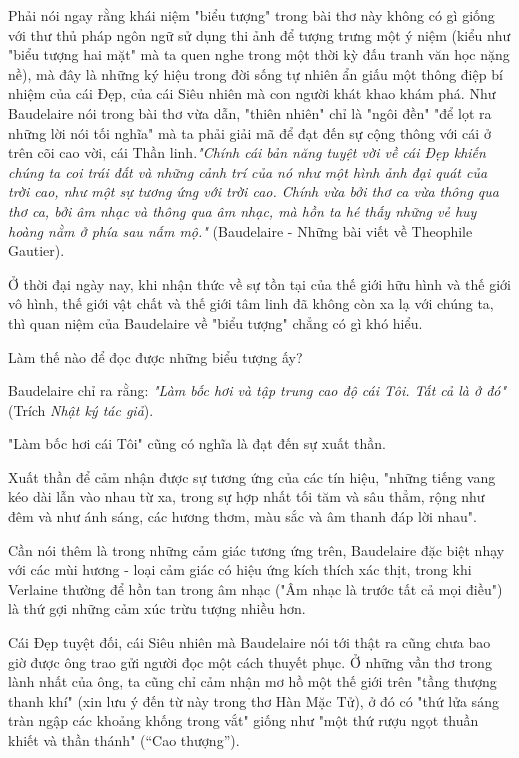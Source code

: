 \documentclass[../main.tex]{subfiles}
\begin{document}
\begin{multicols}{2}
\begin{blockquote}
\end{blockquote}
 
Phải nói ngay rằng khái niệm "biểu tượng" trong bài thơ này không có gì giống với thư thủ pháp ngôn ngữ sử dụng thi ảnh để tượng trưng một ý niệm (kiểu như "biểu tượng hai mặt" mà ta quen nghe trong một thời kỳ đấu tranh văn học nặng nề), mà đây là những ký hiệu trong đời sống tự nhiên ẩn giấu một thông điệp bí nhiệm của cái Đẹp, của cái Siêu nhiên mà con người khát khao khám phá. Như Baudelaire nói trong bài thơ vừa dẫn, "thiên nhiên" chỉ là "ngôi đền" "để lọt ra những lời nói tối nghĩa" mà ta phải giải mã để đạt đến sự cộng thông với cái ở trên cõi cao vời, cái Thần linh.\textit{"Chính cái bản năng tuyệt vời về cái Đẹp khiến chúng ta coi trái đất và những cảnh trí của nó như một hình ảnh đại quát của trời cao, như một sự tương ứng với trời cao. Chính vừa bởi thơ ca vừa thông qua thơ ca, bởi âm nhạc và thông qua âm nhạc, mà hồn ta hé thấy những vẻ huy hoàng nằm ở phía sau nấm mộ." }(Baudelaire - Những bài viết về Theophile Gautier). 
 
Ở thời đại ngày nay, khi nhận thức về sự tồn tại của thế giới hữu hình và thế giới vô hình, thế giới vật chất và thế giới tâm linh đã không còn xa lạ với chúng ta, thì quan niệm của Baudelaire về "biểu tượng" chẳng có gì khó hiểu. 
 
Làm thế nào để đọc được những biểu tượng ấy?  
 
Baudelaire chỉ ra rằng:\textit{ "Làm bốc hơi và tập trung cao độ cái Tôi. Tất cả là ở đó" }(Trích \textit{Nhật ký tác giả}). 
 
"Làm bốc hơi cái Tôi" cũng có nghĩa là đạt đến sự xuất thần.  
 
Xuất thần để cảm nhận được sự tương ứng của các tín hiệu, "những tiếng vang kéo dài lẫn vào nhau từ xa, trong sự hợp nhất tối tăm và sâu thẳm, rộng như đêm và như ánh sáng, các hương thơm, màu sắc và âm thanh đáp lời nhau". 
 
Cần nói thêm là trong những cảm giác tương ứng trên, Baudelaire đặc biệt nhạy với các mùi hương - loại cảm giác có hiệu ứng kích thích xác thịt, trong khi Verlaine thường để hồn tan trong âm nhạc ("Âm nhạc là trước tất cả mọi điều") là thứ gợi những cảm xúc trừu tượng nhiều hơn. 
 
Cái Đẹp tuyệt đối, cái Siêu nhiên mà Baudelaire nói tới thật ra cũng chưa bao giờ được ông trao gửi người đọc một cách thuyết phục. Ở những vần thơ trong lành nhất của ông, ta cũng chỉ cảm nhận mơ hồ một thế giới trên "tầng thượng thanh khí" (xin lưu ý đến từ này trong thơ Hàn Mặc Tử), ở đó có "thứ lửa sáng tràn ngập các khoảng khống trong vắt" giống như "một thứ rượu ngọt thuần khiết và thần thánh" (“Cao thượng”). 
 

\end{multicols}
\end{document}
